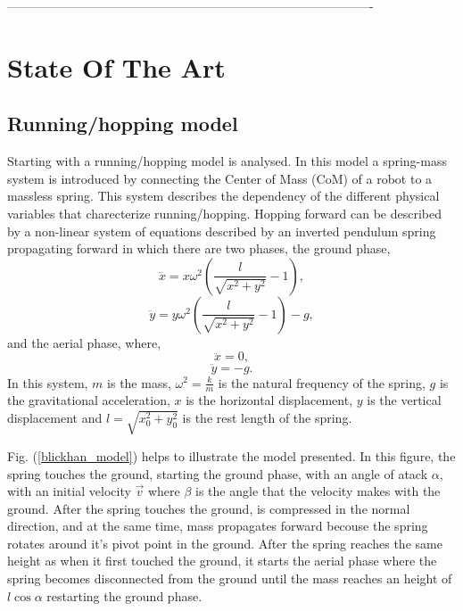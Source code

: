 ----------------------------------------------------------------------------------------
\pagebreak
\section{State Of The Art}



\subsection{Running/hopping model}\label{hoppingmodel}

Starting with \cite{Blickhan1989} a running/hopping model is analysed. In this model a spring-mass system is introduced by connecting the Center of Mass (CoM) of a robot to a massless spring. This system describes the dependency of the different physical variables that charecterize running/hopping. Hopping forward can be described by a non-linear system of equations described by an inverted pendulum spring propagating forward in which there are two phases, the ground phase,
\begin{equation}
  \ddot{x}=x\omega^2\left(\frac{l}{\sqrt{x^2+y^2}}-1\right),
\end{equation}
\begin{equation}
  \ddot{y}=y\omega^2\left(\frac{l}{\sqrt{x^2+y^2}}-1\right)-g,
\end{equation}
and the aerial phase, where,
\begin{equation}
  \ddot{x}=0,
\end{equation}
\begin{equation}
  \ddot{y}=-g.
  \end{equation}
\noindent In this system, $m$ is the mass, $\omega^2=\frac{k}{m}$ is the natural frequency of the spring, $g$ is the gravitational acceleration, $x$ is the horizontal displacement, $y$ is the vertical displacement and $l=\sqrt{x_0^2+y_0^2}$ is the rest length of the spring.

\noindent Fig. (\ref{blickhan_model}) helps to illustrate the model presented. In this figure, the spring touches the ground, starting the ground phase, with an angle of atack $\alpha$, with an initial velocity $\vec{v}$ where $\beta$ is the angle that the velocity makes with the ground. After the spring touches the ground, is compressed in the normal direction, and at the same time, mass propagates forward becouse the spring rotates around it's pivot point in the ground. After the spring reaches the same height as when it first touched the ground, it starts the aerial phase where the spring becomes disconnected from the ground until the mass reaches an height of $l \cos{\alpha}$ restarting the ground phase.  

